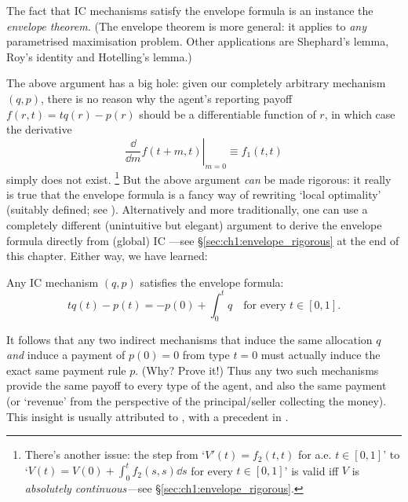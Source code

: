 The fact that IC mechanisms satisfy the envelope formula is an instance the \emph{envelope theorem.}
(The envelope theorem is more general: it applies to \emph{any} parametrised maximisation problem. Other applications are Shephard's lemma, Roy's identity and Hotelling's lemma.)


The above argument has a big hole: given our completely arbitrary mechanism $(q,p)$, there is no reason why the agent's reporting payoff $f(r,t) = t q(r) - p(r)$ should be a differentiable function of $r$, in which case the derivative
%
\begin{equation*}
	\left. \frac{\dd}{\dd m} f( t+m, t ) \right|_{m=0}
	\equiv f_1(t,t)
\end{equation*}
%
simply does not exist.%
	\footnote{There's another issue:
	the step from `$V'(t) = f_2(t,t)$ for a.e. $t \in [0,1]$' to `$V(t) = V(0) + \int_0^t f_2(s,s) \dd s$ for every $t \in [0,1]$'
	is valid iff $V$ is \emph{absolutely continuous---}see §\ref{sec:ch1:envelope_rigorous}.}
But the above argument \emph{can} be made rigorous: it really is true that the envelope formula is a fancy way of rewriting `local optimality' (suitably defined; see \textcite{Sinander2022}).
Alternatively and more traditionally,
one can use a completely different (unintuitive but elegant) argument to derive the envelope formula directly from (global) IC \parencite{MilgromSegal2002}---see §\ref{sec:ch1:envelope_rigorous} at the end of this chapter.
Either way, we have learned:

\begin{namedthm}
	\label{proposition:ic_env}
	Any IC mechanism $(q,p)$ satisfies the envelope formula:
	\begin{equation*}
		t q(t) - p(t) = - p(0) + \int_0^t q
		\quad \text{for every $t \in [0,1]$.}
	\end{equation*}
\end{namedthm}


\begin{remark}
	\label{remark:rev_equivalence}
	It follows that any two indirect mechanisms
	that induce the same allocation $q$
	\emph{and} induce a payment of $p(0)=0$ from type $t=0$
	must actually induce the exact same payment rule $p$.
	(Why? Prove it!)
	Thus any two such mechanisms provide the same payoff to every type of the agent,
	and also the same payment (or `revenue' from the perspective of the principal/seller collecting the money).
	This insight is usually attributed to \textcite{Myerson1981}, with a precedent in \textcite{Vickrey1961}.
\end{remark}


